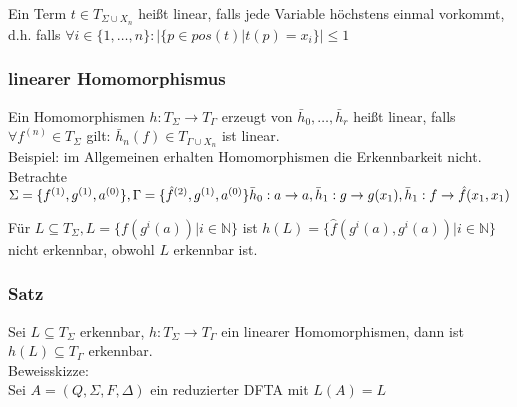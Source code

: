 \documentclass[titlepage]{article}
\begin{document}
Ein Term $t \in T_{\Sigma \cup X_n}$ hei\ss t linear, falls jede Variable h\"ochstens einmal 
vorkommt, \\
d.h. falls $\forall i \in \{1, \dots , n\}: | \{ p \in pos (t) | t(p) = x_i \} | \leq 1$

\subsubsection{linearer Homomorphismus}

Ein Homomorphismen $h: T_\Sigma \to T_\Gamma$ erzeugt von $\bar{h}_0 , \dots, \bar{h}_r$ 
hei\ss t linear, falls $\forall f^{(n)} \in T_\Sigma$ gilt:
$\bar{h}_n(f) \in T_{\Gamma \cup X_n}$ ist linear.\\

Beispiel: im Allgemeinen erhalten Homomorphismen die Erkennbarkeit nicht.\\
Betrachte\\ 
	$\Sigma = \{ f^{(1)}, g^{(1)}, a^{(0)} \}, 
	\Gamma = \{ \hat{f}^{(2)}, g^{(1)}, a^{(0)} \}\\
	\bar{h}_0: a \to a, \bar{h}_1: g \to g(x_1), \bar{h}_1: f \to \hat{f}(x_1, x_1)$

F\"ur $L \subseteq T_\Sigma, L = \{f(g^i(a)) | i \in \mathbb{N} \}$ ist
$h(L) = \{\hat{f}(g^i(a), g^i(a)) | i \in \mathbb{N} \}$ nicht erkennbar, 
obwohl $L$ erkennbar ist.

\subsubsection{Satz}

Sei $L \subseteq T_\Sigma$ erkennbar, $h: T_\Sigma \to T_\Gamma$ ein linearer Homomorphismen,
dann ist $h(L) \subseteq T_\Gamma$ erkennbar.\\

Beweisskizze:\\
Sei $A = (Q, \Sigma, F, \Delta)$ ein reduzierter DFTA mit $L(A) = L$
\end{document}
